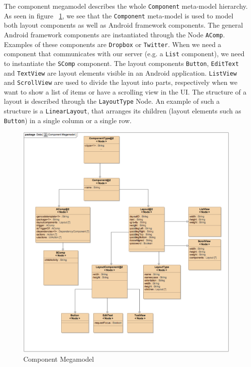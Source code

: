 The component megamodel describes the whole \texttt{Component} meta-model hierarchy. As seen in figure ~\ref{fig:component_megamodel}, we see that the \texttt{Component} meta-model is used to model both layout components as well as Android framework components. The general Android framework components are instantiated through the Node \texttt{AComp}. Examples of these components are \texttt{Dropbox} or \texttt{Twitter}. When we need a component that communicates with our server (e.g. a \texttt{List} component), we need to instantiate the \texttt{SComp} component. The layout components \texttt{Button}, \texttt{EditText} and \texttt{TextView} are layout elements visible in an Android application. \texttt{ListView} and \texttt{ScrollView} are used to divide the layout into parts, respectively when we want to show a list of items or have a scrolling view in the UI. The structure of a layout is described through the \texttt{LayoutType} Node. An example of such a structure is a \texttt{LinearLayout}, that arranges its children (layout elements such as \texttt{Button}) in a single column or a single row.
\begin{figure}[h!]
\centering
\includegraphics[width=1.0\textwidth]{images/chap6_component_megam.png}
\caption{Component Megamodel}
\label{fig:component_megamodel}
\end{figure}


